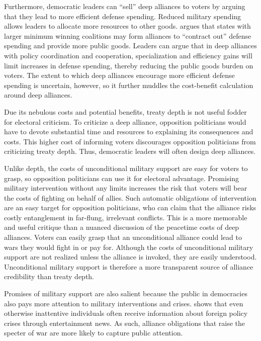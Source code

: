 \documentclass[12pt]{article}
\begin{document}
Furthermore, democratic leaders can ``sell'' deep alliances to voters by arguing that they lead to more efficient defense spending. 
Reduced military spending allows leaders to allocate more resources to other goods.  
\citet{Kimball2010} argues that states with larger minimum winning coalitions may form alliances to ``contract out'' 
defense spending and provide more public goods. 
Leaders can argue that in deep alliances with policy coordination and cooperation, specialization and efficiency gains will limit increases in defense spending, thereby reducing the public goods burden on voters.  
The extent to which deep alliances encourage more efficient defense spending is uncertain, however, so it further muddles the cost-benefit calculation around deep alliances. 


Due its nebulous costs and potential benefits, treaty depth is not useful fodder for electoral criticism.
To criticize a deep alliance, opposition politicians would have to devote substantial time and resources to explaining its consequences and costs.  
This higher cost of informing voters discourages opposition politicians from criticizing treaty depth. 
Thus, democratic leaders will often design deep alliances. 


Unlike depth, the costs of unconditional military support are easy for voters to grasp, so opposition politicians can use it for electoral advantage. 
Promising military intervention without any limits increases the risk that voters will bear the costs of fighting on behalf of allies. 
Such automatic obligations of intervention are an easy target for opposition politicians, who can claim that the alliance risks costly entanglement in far-flung, irrelevant conflicts.  
This is a more memorable and useful critique than a nuanced discussion of the peacetime costs of deep alliances. 
Voters can easily grasp that an unconditional alliance could lead to wars they would fight in or pay for. 
Although the costs of unconditional military support are not realized unless the alliance is invoked, they are easily understood.
Unconditional military support is therefore a more transparent source of alliance credibility than treaty depth.  


Promises of military support are also salient because the public in democracies also pays more attention to military interventions and crises. 
\citet{Baum2002} shows that even otherwise inattentive individuals often receive information about foreign policy crises through entertainment news. 
As such, alliance obligations that raise the specter of war are more likely to capture public attention. 
\end{document}
